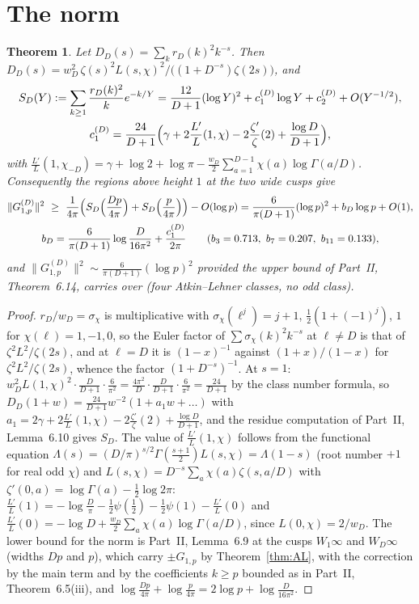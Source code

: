 \documentclass[11pt]{amsart}
\newtheorem{theorem}{Theorem}[section]
\theoremstyle{remark}
\begin{document}
\section{The norm}
\begin{theorem}\label{thm:norm}
Let $D_D(s)=\sum_kr_D(k)^2k^{-s}$. Then $D_D(s)=w_D^2\,\zeta(s)^2L(s,\chi)^2/\bigl((1+D^{-s})\zeta(2s)\bigr)$, and
\begin{gather*}
S_D(Y):=\sum_{k\ge1}\frac{r_D(k)^2}k e^{-k/Y}=\frac{12}{D+1}(\log Y)^2+c_1^{(D)}\log Y+c_2^{(D)}+O(Y^{-1/2}),\\
c_1^{(D)}=\frac{24}{D+1}\Bigl(\gamma+2\frac{L'}L(1,\chi)-2\frac{\zeta'}\zeta(2)+\frac{\log D}{D+1}\Bigr),
\end{gather*}
with $\frac{L'}L(1,\chi_{-D})=\gamma+\log2+\log\pi-\frac{w_D}2\sum_{a=1}^{D-1}\chi(a)\log\Gamma(a/D)$. Consequently the regions above height $1$ at the two wide cusps give
\begin{gather*}
\|G^{(D)}_{1,p}\|^2\ \ge\ \frac1{4\pi}\Bigl(S_D\Bigl(\frac{Dp}{4\pi}\Bigr)+S_D\Bigl(\frac p{4\pi}\Bigr)\Bigr)-O(\log p)=\frac6{\pi(D+1)}(\log p)^2+b_D\log p+O(1),\\
b_D=\frac{6}{\pi(D+1)}\log\frac D{16\pi^2}+\frac{c_1^{(D)}}{2\pi}\qquad(b_3=0.713,\ b_7=0.207,\ b_{11}=0.133),
\end{gather*}
and $\|G^{(D)}_{1,p}\|^2\sim\frac6{\pi(D+1)}(\log p)^2$ provided the upper bound of Part~II, Theorem~6.14, carries over (four Atkin--Lehner classes, no odd class).
\end{theorem}
\begin{proof}
$r_D/w_D=\sigma_\chi$ is multiplicative with $\sigma_\chi(\ell^j)=j+1$, $\frac12(1+(-1)^j)$, $1$ for $\chi(\ell)=1,-1,0$, so the Euler factor of $\sum\sigma_\chi(k)^2k^{-s}$ at $\ell\ne D$ is that of $\zeta^2L^2/\zeta(2s)$, and at $\ell=D$ it is $(1-x)^{-1}$ against $(1+x)/(1-x)$ for $\zeta^2L^2/\zeta(2s)$, whence the factor $(1+D^{-s})^{-1}$. At $s=1$: $w_D^2L(1,\chi)^2\cdot\frac{D}{D+1}\cdot\frac6{\pi^2}=\frac{4\pi^2}D\cdot\frac D{D+1}\cdot\frac6{\pi^2}=\frac{24}{D+1}$ by the class number formula, so $D_D(1+w)=\frac{24}{D+1}w^{-2}(1+a_1w+\dots)$ with $a_1=2\gamma+2\frac{L'}L(1,\chi)-2\frac{\zeta'}\zeta(2)+\frac{\log D}{D+1}$, and the residue computation of Part~II, Lemma~6.10 gives $S_D$. The value of $\frac{L'}L(1,\chi)$ follows from the functional equation $\Lambda(s)=(D/\pi)^{s/2}\Gamma(\frac{s+1}2)L(s,\chi)=\Lambda(1-s)$ (root number $+1$ for real odd $\chi$) and $L(s,\chi)=D^{-s}\sum_a\chi(a)\zeta(s,a/D)$ with $\zeta'(0,a)=\log\Gamma(a)-\frac12\log2\pi$: $\frac{L'}L(1)=-\log\frac D\pi-\frac12\psi(\tfrac12)-\frac12\psi(1)-\frac{L'}L(0)$ and $\frac{L'}L(0)=-\log D+\frac{w_D}2\sum_a\chi(a)\log\Gamma(a/D)$, since $L(0,\chi)=2/w_D$. The lower bound for the norm is Part~II, Lemma~6.9 at the cusps $W_1\infty$ and $W_D\infty$ (widths $Dp$ and $p$), which carry $\pm G_{1,p}$ by Theorem~\ref{thm:AL}, with the correction by the main term and by the coefficients $k\ge p$ bounded as in Part~II, Theorem~6.5(iii), and $\log\frac{Dp}{4\pi}+\log\frac p{4\pi}=2\log p+\log\frac D{16\pi^2}$.
\end{proof}
\end{document}
